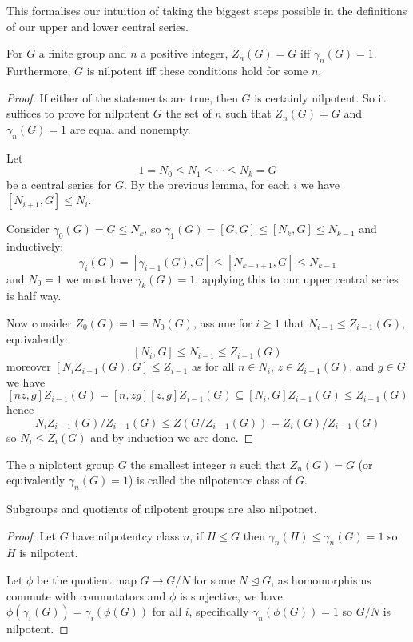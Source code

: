 \documentclass{article}
\begin{document}
This formalises our intuition of taking the biggest steps possible in the definitions of our upper and lower central series.

\begin{theorem}
    For $G$ a finite group and $n$ a positive integer, $Z_n(G)=G$ iff $\gamma_n(G)=1$. Furthermore, $G$ is nilpotent iff these conditions hold for some $n$.
    \begin{proof}
        If either of the statements are true, then $G$ is certainly nilpotent. So it suffices to prove for nilpotent $G$ the set of $n$ such that $Z_n(G) = G$ and $\gamma_n(G)=1$ are equal and nonempty.

        Let \[
        1 = N_0 \leq N_1 \leq \cdots \leq N_k = G
        \] be a central series for $G$. By the previous lemma, for each $i$ we have $[N_{i+1},G]\leq N_i$.

        Consider $\gamma_0(G)=G\leq N_k$, so $\gamma_1(G)=[G,G]\leq[N_k,G]\leq N_{k-1}$ and inductively: \[
        \gamma_i(G) = [\gamma_{i-1}(G),G] \leq [N_{k-i+1},G]\leq N_{k-1}
        \] and $N_0=1$ we must have $\gamma_k(G)=1$, applying this to our upper central series is half way.

        Now consider $Z_0(G) = 1 = N_0(G)$, assume for $i\geq 1$ that $N_{i-1}\leq Z_{i-1}(G)$, equivalently: \[
        [N_i,G]\leq N_{i-1}\leq Z_{i-1}(G)
        \] moreover $[N_iZ_{i-1}(G),G]\leq Z_{i-1}$ as for all $n\in N_i$, $z\in Z_{i-1}(G)$, and $g\in G$ we have \[
        [nz,g]Z_{i-1}(G) = [n,zg][z,g]Z_{i-1}(G)\subseteq [N_i,G]Z_{i-1}(G) \leq Z_{i-1}(G)
        \] hence \[
            N_iZ_{i-1}(G)/Z_{i-1}(G) \leq Z(G/Z_{i-1}(G)) = Z_{i}(G)/Z_{i-1}(G)
        \] so $N_i\leq Z_i(G)$ and by induction we are done.
    \end{proof}
\end{theorem}

\begin{definition}
    The a niplotent group $G$ the smallest integer $n$ such that $Z_n(G)=G$ (or equivalently $\gamma_n(G)=1$) is called the nilpotentce class of $G$.
\end{definition}

\begin{corollary}
    Subgroups and quotients of nilpotent groups are also nilpotnet.\begin{proof}
        Let $G$ have nilpotentcy class $n$, if $H\leq G$ then $\gamma_n(H)\leq\gamma_n(G)=1$ so $H$ is nilpotent.

        Let $\phi$ be the quotient map $G\rightarrow G/N$ for some $N\unlhd G$, as homomorphisms commute with commutators and $\phi$ is surjective, we have $\phi(\gamma_i(G))=\gamma_i(\phi(G))$ for all $i$, specifically $\gamma_n(\phi(G))=1$ so $G/N$ is nilpotent.
    \end{proof}
\end{corollary}
\end{document}

